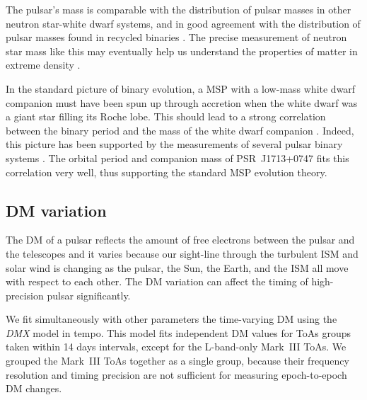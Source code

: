 The pulsar's mass is comparable with the distribution of pulsar masses
in other neutron star-white dwarf systems, and in good
agreement with the distribution of pulsar masses found in recycled binaries
\citep{opns12,kkdt13}. The precise measurement of neutron star mass like this
may eventually help us understand the properties of matter in extreme 
density \citep{lat12}.

In the standard picture of binary evolution, a MSP with a low-mass white dwarf companion must have been spun up through accretion when the white dwarf was a giant star filling its Roche lobe. 
This should lead to a strong correlation between the binary period and the mass of the white dwarf companion \citep{rpj+95, ts99a, prp02b}. 
Indeed, this picture has been supported by the measurements of several pulsar
binary systems \citep[e.g.,][]{vbb+01, ktr94, th14}.  
The orbital period and companion mass of PSR~J1713+0747 fits
this correlation very well, thus supporting the standard MSP evolution theory. %




\subsection{DM variation}
\label{sec:dmx}
The DM of a pulsar reflects the amount of free electrons between
the pulsar and the telescopes and it varies because
our sight-line through the turbulent ISM and solar wind is changing as the
pulsar, the Sun, the Earth, and the ISM all move with respect to each other.
The DM variation can affect the timing of high-precision pulsar significantly.

We fit simultaneously with other parameters the time-varying DM using the {\it DMX} model in {\sc tempo}.
This model fits independent DM values for ToAs groups taken within 14 days
intervals, except for the L-band-only Mark~III ToAs. We grouped the Mark~III
ToAs together as a single group, because their frequency resolution and timing
precision are not sufficient for measuring epoch-to-epoch DM changes.

